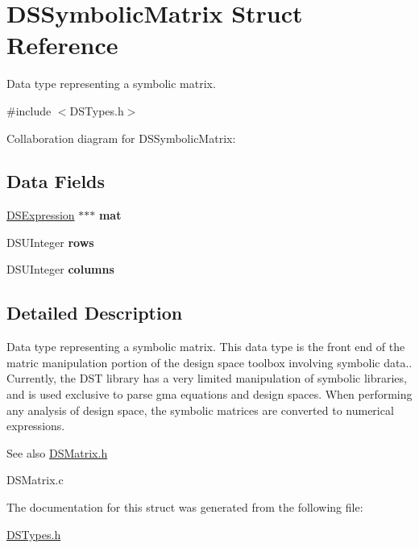 \hypertarget{struct_d_s_symbolic_matrix}{
\section{DSSymbolicMatrix Struct Reference}
\label{struct_d_s_symbolic_matrix}
}


Data type representing a symbolic matrix.  




{\ttfamily \#include $<$DSTypes.h$>$}



Collaboration diagram for DSSymbolicMatrix:\subsection*{Data Fields}
\begin{DoxyCompactItemize}
\item 
\hypertarget{struct_d_s_symbolic_matrix_ad744ab58f2d41731b4b504021045cfb9}{
\hyperlink{structdsexpression}{DSExpression} $\ast$$\ast$$\ast$ {\bfseries mat}}
\label{struct_d_s_symbolic_matrix_ad744ab58f2d41731b4b504021045cfb9}

\item 
\hypertarget{struct_d_s_symbolic_matrix_abc69b7682293d99094ac37ed894a0249}{
DSUInteger {\bfseries rows}}
\label{struct_d_s_symbolic_matrix_abc69b7682293d99094ac37ed894a0249}

\item 
\hypertarget{struct_d_s_symbolic_matrix_afb99a05f6e779cf7c631393281dddda9}{
DSUInteger {\bfseries columns}}
\label{struct_d_s_symbolic_matrix_afb99a05f6e779cf7c631393281dddda9}

\end{DoxyCompactItemize}


\subsection{Detailed Description}
Data type representing a symbolic matrix. This data type is the front end of the matric manipulation portion of the design space toolbox involving symbolic data.. Currently, the DST library has a very limited manipulation of symbolic libraries, and is used exclusive to parse gma equations and design spaces. When performing any analysis of design space, the symbolic matrices are converted to numerical expressions.

\begin{DoxySeeAlso}{See also}
\hyperlink{_d_s_matrix_8h}{DSMatrix.h} 

DSMatrix.c 
\end{DoxySeeAlso}


The documentation for this struct was generated from the following file:\begin{DoxyCompactItemize}
\item 
\hyperlink{_d_s_types_8h}{DSTypes.h}\end{DoxyCompactItemize}
